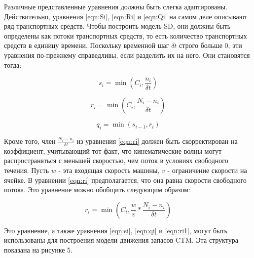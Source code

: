 
Различные представленные уравнения должны быть слегка адаптированы. Действительно, уравнения \ref{eqn:Si}, \ref{eqn:Ri} и \ref{eqn:Qi} на самом деле описывают ряд транспортных средств. Чтобы построить модель SD, они должны быть определены как потоки транспортных средств, то есть количество транспортных средств в единицу времени. Поскольку временной шаг $\delta t$ строго больше 0, эти уравнения по-прежнему справедливы, если разделить их на него. Они становятся тогда:

\begin{equation}
    \label{eqn:si}
    s_i = \min(C_i, \frac{n_i}{\delta t})
\end{equation}

\begin{equation}
    \label{eqn:ri}
    r_i = \min(C_i, \frac{N_i − n_i}{\delta t})
\end{equation}

\begin{equation}
    \label{eqn:qi}
    q_i = \min(s_{i−1}, r_i)
\end{equation}


Кроме того, член $\frac{N_i − n_i}{\delta t}$ из уравнения \ref{eqn:ri} должен быть скорректирован на коэффициент, учитывающий тот факт, что кинематические волны могут распространяться с меньшей скоростью, чем поток в условиях свободного течения. Пусть $w$ - эта входящая скорость машины, $v$ - ограничение скорости на ячейке. В уравнении \ref{eqn:ri} предполагается, что она равна скорости свободного потока. Это уравнение можно обобщить следующим образом:

\begin{equation}
    \label{eqn:ri1}
    r_i = \min(C_i, \frac{w}{v} * \frac{N_i − n_i}{δt})
\end{equation}


Это уравнение, а также уравнения \ref{eqn:si}, \ref{eqn:qi} и \ref{eqn:ri1}, могут быть использованы для построения модели движения запасов CTM. Эта структура показана на рисунке 5.

\clearpage